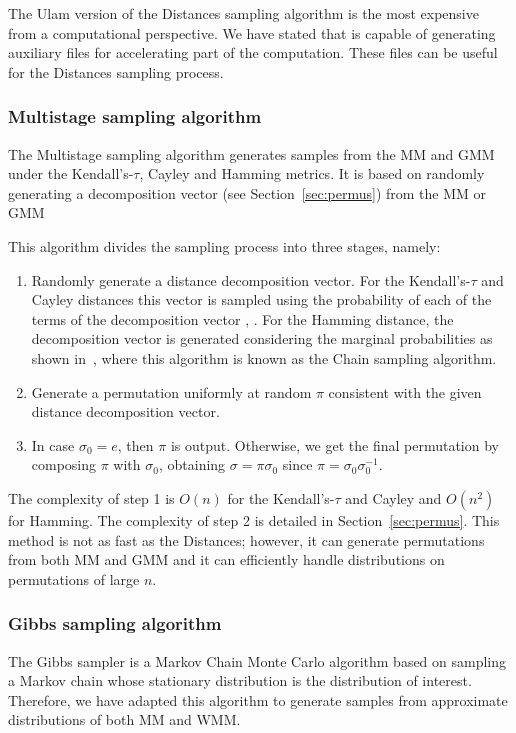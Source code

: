 \documentclass[article,nojss]{jss}
\begin{document}
The Ulam version of the Distances sampling algorithm is the most expensive from a computational perspective. We have stated that  is capable of generating auxiliary files for accelerating part of the computation. These files can be useful for the Distances sampling process. 

\subsubsection{Multistage sampling algorithm}%
The Multistage sampling algorithm generates samples from the MM and GMM under the Kendall's-$\tau$, Cayley and Hamming metrics. It is based on randomly generating a decomposition vector (see Section~\ref{sec:permus}) from the MM or GMM

This algorithm divides the sampling process into three stages, namely:
\begin{enumerate}
 \item Randomly generate a distance decomposition vector. For the Kendall's-$\tau$ and Cayley distances this vector is sampled using the probability of each of the terms of the decomposition vector \citep{gMallows}, \citep{Irurozki2014b}. For the Hamming distance, the decomposition vector is generated considering the marginal probabilities as shown in~\cite{Irurozki2014a}, where this algorithm is known as the Chain sampling algorithm.
 \item Generate a permutation uniformly at random $\pi$ consistent with the given distance decomposition vector.
 \item In case $\sigma_0= e$, then $\pi$ is output. Otherwise, we get the final permutation by composing $\pi$ with $\sigma_0$, obtaining $\sigma=\pi\sigma_0$ since $\pi = \sigma_0\sigma_0^{-1}$.
\end{enumerate}


The complexity of step 1 is $O(n)$ for the Kendall's-$\tau$ and Cayley and $O(n^2)$ for Hamming. The complexity of step 2 is detailed in Section~\ref{sec:permus}. This method is not as fast as the Distances; however, it can generate permutations from both MM and GMM and it can efficiently handle distributions on permutations of large $n$. 

\subsubsection{Gibbs sampling algorithm}%
The Gibbs sampler is a Markov Chain Monte Carlo algorithm based on sampling a Markov chain whose stationary distribution is the distribution of interest. Therefore, we have adapted this algorithm to generate samples from approximate distributions of both MM and WMM. 
\end{document}

